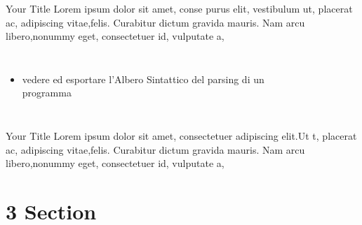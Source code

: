 \documentclass[aspectratio  =  169, 15pt]{beamer}
\begin{document}
    \begin{frame}{Your Title}
        Lorem ipsum dolor sit amet, conse purus elit, vestibulum ut, placerat ac, adipiscing vitae,felis. Curabitur dictum gravida mauris. Nam arcu libero,nonummy eget, consectetuer id, vulputate a,
        \begin{columns}[t]
            \begin{itemize}
            	\item vedere ed esportare l'{\color{yellow}Albero Sintattico} del parsing di un programma
            \end{itemize}
            \vspace*{-25pt}
            \begin{figure}[H]
                \centering
                \noindent{}
            \end{figure}
        \end{columns}
    \end{frame}
    
    \begin{frame}{Your Title}
        Lorem ipsum dolor sit amet, consectetuer adipiscing elit.Ut t, placerat ac, adipiscing vitae,felis. Curabitur dictum gravida mauris. Nam arcu libero,nonummy eget, consectetuer id, vulputate a,
    \end{frame}
    
    \section{3 Section}
    
\end{document}
